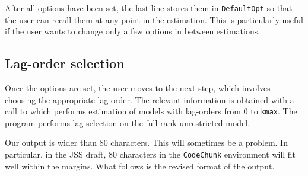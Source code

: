 \documentclass[article]{jss}
\newcommand{\fct}[1]{\code{#1()}}
\begin{document}
%

After all options have been set, the last line 
stores them in \verb|DefaultOpt| so that the user can recall them at any point in the estimation. This is particularly useful if the user wants to change only a few options in between estimations.


\subsection{Lag-order selection}

Once the options are set, the user moves to the next step, which involves choosing the appropriate lag order. The relevant information is obtained with a call to \fct{FCVARlagSelect}
which performs estimation of models with lag-orders from $0$ to \verb|kmax|. The program performs lag selection on the full-rank unrestricted model. 

\begin{leftbar}
Our  output is wider than 80 characters. This will sometimes be a problem. 
In particular, in the JSS draft, 80 characters in the \verb|CodeChunk| environment will fit well within the margins.
What follows is the revised format of the output.
\end{leftbar}
\end{document}
